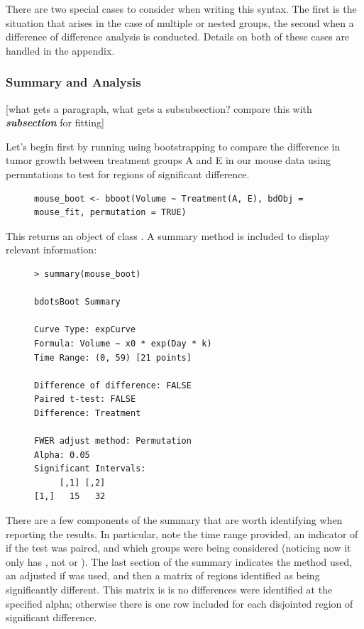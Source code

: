 There are two special cases to consider when writing this syntax. The first is the situation that arises in the case of multiple or nested groups, the second when a difference of difference analysis is conducted. Details on both of these cases are handled in the appendix. 



\subsubsection{Summary and Analysis}

[what gets a paragraph, what gets a subsubsection?  compare this with \textit{\textbf{subsection}} for fitting]

Let's begin first by running  using bootstrapping to compare the difference in tumor growth between treatment groups A and E in our mouse data using permutations to test for regions of significant difference. 

\begin{singlespace}
\begin{figure}[H]
\centering
\begin{BVerbatim}
mouse_boot <- bboot(Volume ~ Treatment(A, E), bdObj = mouse_fit, permutation = TRUE)
\end{BVerbatim}
\end{figure}
\end{singlespace}


This returns an object of class . A summary method is included to display relevant information:

\begin{singlespace}
\begin{figure}[H]
\centering
\begin{BVerbatim}
> summary(mouse_boot)

bdotsBoot Summary

Curve Type: expCurve 
Formula: Volume ~ x0 * exp(Day * k) 
Time Range: (0, 59) [21 points]

Difference of difference: FALSE 
Paired t-test: FALSE 
Difference: Treatment 

FWER adjust method: Permutation 
Alpha: 0.05 
Significant Intervals:
     [,1] [,2]
[1,]   15   32
\end{BVerbatim}
\end{figure}
\end{singlespace}

There are a few components of the summary that are worth identifying when reporting the results. In particular, note the time range provided, an indicator of if the test was paired, and which groups were being considered (noticing now it only has , not  or ). The last section of the summary indicates the method used, an adjusted  if  was used, and then a matrix of regions identified as being significantly different. This matrix is  is no differences were identified at the specified alpha; otherwise there is one row included for each disjointed region of significant difference.

